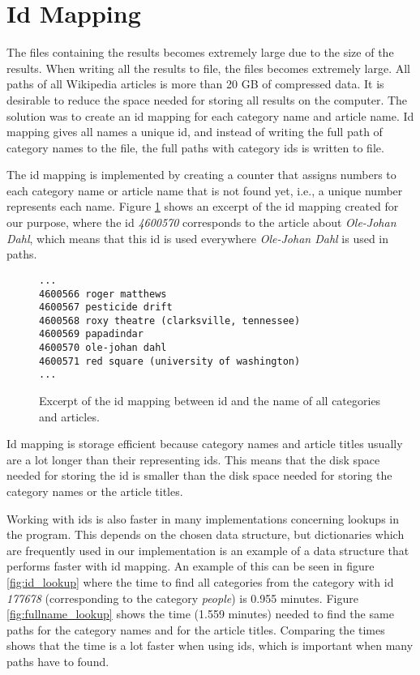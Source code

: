 \section{Id Mapping}
The files containing the results becomes extremely large due to the size of the results. When writing all the results to file, the files becomes extremely large. All paths of all Wikipedia articles is more than 20 GB of compressed data. It is desirable to reduce the space needed for storing all results on the computer. The solution was to create an id mapping for each category name and article name. Id mapping gives all names a unique id, and instead of writing the full path of category names to the file, the full paths with category ids is written to file. 

The id mapping is implemented by creating a counter that assigns numbers to each category name or article name that is not found yet, i.e., a unique number represents each name. Figure \ref{fig:idmapping} shows an excerpt of the id mapping created for our purpose, where the id \emph{4600570} corresponds to the article about \emph{Ole-Johan Dahl}, which means that this id is used everywhere \emph{Ole-Johan Dahl} is used in paths. 

\begin{figure}[h]
\centering
\begin{lstlisting}
...
4600566 roger matthews
4600567 pesticide drift
4600568 roxy theatre (clarksville, tennessee)
4600569 papadindar
4600570 ole-johan dahl
4600571 red square (university of washington)
...
\end{lstlisting}
\caption[Id mapping example]{Excerpt of the id mapping between id and the name of all categories and articles.}
\label{fig:idmapping}
\end{figure}

Id mapping is storage efficient because category names and article titles usually are a  lot longer than their representing ids. This means that the disk space needed for storing the id is smaller than the disk space needed for storing the category names or the article titles. 

Working with ids is also faster in many implementations concerning lookups in the program. This depends on the chosen data structure, but dictionaries which are frequently used in our implementation is an example of a data structure that performs faster with id mapping. An example of this can be seen in figure \ref{fig:id_lookup} where the time to find all categories from the category with id \emph{177678} (corresponding to the category \emph{people}) is 0.955 minutes. Figure \ref{fig:fullname_lookup} shows the time (1.559 minutes) needed to find the same paths for the category names and for the article titles. Comparing the times shows that the time is a lot faster when using ids, which is important when many paths have to found.

